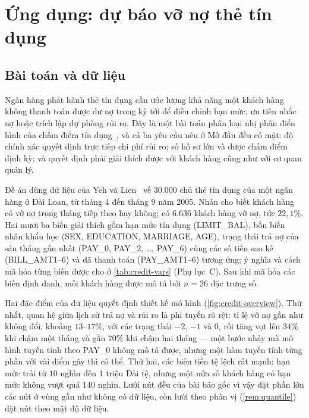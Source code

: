 \section{Ứng dụng: dự báo vỡ nợ thẻ tín dụng}\label{sec:application}

\subsection{Bài toán và dữ liệu}

Ngân hàng phát hành thẻ tín dụng cần ước lượng khả năng một khách hàng không thanh toán được dư nợ trong kỳ tới để điều chỉnh hạn mức, ưu tiên nhắc nợ hoặc trích lập dự phòng rủi ro. Đây là một bài toán phân loại nhị phân điển hình của chấm điểm tín dụng~\cite{thomas2002}, và cả ba yêu cầu nêu ở Mở đầu đều có mặt: độ chính xác quyết định trực tiếp chi phí rủi ro; số hồ sơ lớn và được chấm điểm định kỳ; và quyết định phải giải thích được với khách hàng cũng như với cơ quan quản lý.

Đề án dùng dữ liệu của Yeh và Lien~\cite{yeh2009} về $30.000$ chủ thẻ tín dụng của một ngân hàng ở Đài Loan, từ tháng 4 đến tháng 9 năm 2005. Nhãn cho biết khách hàng có vỡ nợ trong tháng tiếp theo hay không; có $6.636$ khách hàng vỡ nợ, tức $22{,}1\%$. Hai mươi ba biến giải thích gồm hạn mức tín dụng (LIMIT\_BAL), bốn biến nhân khẩu học (SEX, EDUCATION, MARRIAGE, AGE), trạng thái trả nợ của sáu tháng gần nhất (PAY\_0, PAY\_2, \dots, PAY\_6) cùng các số tiền sao kê (BILL\_AMT1--6) và đã thanh toán (PAY\_AMT1--6) tương ứng; ý nghĩa và cách mã hóa từng biến được cho ở \cref{tab:credit-vars} (Phụ lục~C). Sau khi mã hóa các biến định danh, mỗi khách hàng được mô tả bởi $n=26$ đặc trưng số.

Hai đặc điểm của dữ liệu quyết định thiết kế mô hình (\cref{fig:credit-overview}). Thứ nhất, quan hệ giữa lịch sử trả nợ và rủi ro là phi tuyến rõ rệt: tỉ lệ vỡ nợ gần như không đổi, khoảng $13$--$17\%$, với các trạng thái $-2$, $-1$ và $0$, rồi tăng vọt lên $34\%$ khi chậm một tháng và gần $70\%$ khi chậm hai tháng --- một bước nhảy mà mô hình tuyến tính theo PAY\_0 không mô tả được, nhưng một hàm tuyến tính từng phần với vài điểm gãy thì có thể. Thứ hai, các biến tiền tệ lệch rất mạnh: hạn mức trải từ $10$ nghìn đến $1$ triệu Đài tệ, nhưng một nửa số khách hàng có hạn mức không vượt quá $140$ nghìn. Lưới nút đều của bài báo gốc vì vậy đặt phần lớn các nút ở vùng gần như không có dữ liệu, còn lưới theo phân vị (\cref{rem:quantile}) đặt nút theo mật độ dữ liệu.

